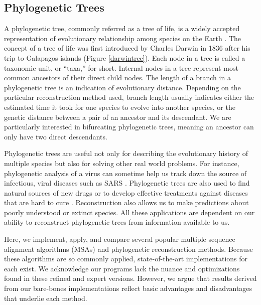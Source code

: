 \documentclass[10pt,twocolumn]{article}
\begin{document}
\subsection*{Phylogenetic Trees}
A phylogenetic tree, commonly referred as a tree of life, is a widely accepted representation of evolutionary relationship among species on the Earth \cite{Baum-Phylotree}. The concept of a tree of life was first introduced by Charles Darwin in 1836 after his trip to Galapagos islands (Figure \ref{darwintree}). Each node in a tree is called a taxonomic unit, or ``taxa,'' for short. Internal nodes in a tree represent most common ancestors of their direct child nodes. The length of a branch in a phylogenetic tree is an indication of evolutionary distance. Depending on the particular reconstruction method used, branch length usually indicates either the estimated time it took for one species to evolve into another species, or the genetic distance between a pair of an ancestor and its descendant. We are particularly interested in bifurcating phylogenetic trees, meaning an ancestor can only have two direct descendants.

Phylogenetic trees are useful not only for describing the evolutionary history of multiple species but also for solving other real world problems. For instance, phylogenetic analysis of a virus can sometime help us track down the source of infectious, viral diseases such as SARS \cite{li2005bats}. Phylogenetic trees are also used to find natural sources of new drugs or to develop effective treatments against diseases that are hard to cure \cite{Pillai-HIV}. Reconstruction also allows us to make predictions about poorly understood or extinct species. All these applications are dependent on our ability to reconstruct phylogenetic trees from information available to us. 

Here, we implement, apply, and compare several popular multiple sequence alignment algorithms (MSAs) and phylogenetic reconstruction methods. Because these algorithms are so commonly applied, state-of-the-art implementations for each exist. We acknowledge our programs lack the nuance and optimizations found in these refined and expert versions. However, we argue that results derived from our bare-bones implementations reflect basic advantages and disadvantages that underlie each method.
\end{document}
